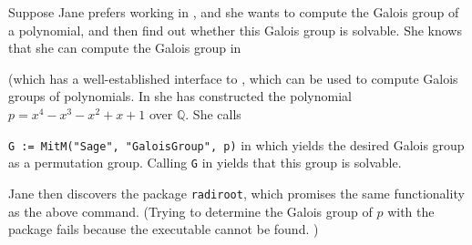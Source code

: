 Suppose Jane prefers working in \GAP, and she wants to compute the
Galois group of a polynomial, and then find out whether this Galois group is
solvable.
She knows that she can compute the Galois group in \Sage

(which has a well-established interface to \Pari, which can be used to
compute Galois groups of polynomials. In \GAP she has constructed the polynomial
$p =x^4-x^3-x^2+x+1$ over $\mathbb{Q}$. She calls

\lstinline|G := MitM("Sage", "GaloisGroup", p)| in \GAP which yields the desired
Galois group as a permutation group. Calling \lstinline|G| in \GAP yields that
this group is solvable.

Jane then discovers the \GAP package \texttt{radiroot}, which promises the same
functionality as the above command. (Trying to determine the Galois group of $p$
with the package fails because the \PARI executable cannot be found.
)




